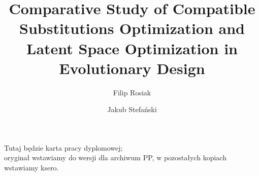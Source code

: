 \documentclass[english,master,a4paper,oneside]{ppfcmthesis}
\author{%
   Filip Rosiak \album{151799} \and Jakub Stefański \album{151876}
}
\title{Comparative Study of Compatible Substitutions Optimization and Latent Space Optimization in Evolutionary Design}
\begin{document}
\frontmatter\pagestyle{empty}%
\maketitle\cleardoublepage%


\thispagestyle{empty}\vspace*{\fill}%
\begin{center}Tutaj będzie karta pracy dyplomowej;\\oryginał wstawiamy do wersji dla archiwum PP, w pozostałych kopiach wstawiamy ksero.\end{center}%
\vfill\cleardoublepage%


\pagestyle{ppfcmthesis}%


\cleardoublepage
\tableofcontents* 
\cleardoublepage %


\mainmatter%








{\raggedright\sloppy\small}


\cleardoublepage\appendix%
\newpage



\ppcolophon
\end{document}
